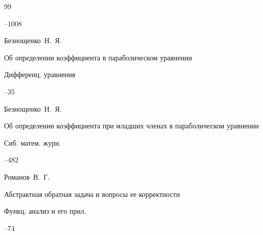 \begin{thebibliography}{99}



--1008










\by  Безнощенко~Н.~Я. 

\paper Об определении коэффициента в параболическом уравнении 

\jour Дифференц. уравнения




--35




\by Безнощенко~Н.~Я.

\paper Об определении коэффициента при младших членах в параболическом уравнении 

\jour Сиб. матем. журн.




–482




\by Романов~В.~Г.  

\paper Абстрактная обратная задача и вопросы ее корректности

\jour Функц. анализ и его прил.




--74









\end{thebibliography}
